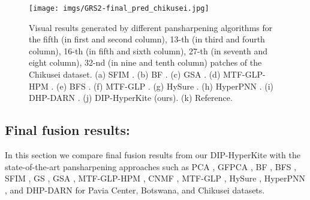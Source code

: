 \documentclass[journal]{IEEEtran}
\begin{document}
    \begin{figure}[tb]
        \centering
        \texttt{[image: imgs/GRS2-final\_pred\_chikusei.jpg]}
        \caption{Visual results generated by different pansharpening algorithms for the fifth (in first and second column), 13-th (in third and fourth column), 16-th (in fifth and sixth column), 27-th (in seventh and eight column), 32-nd (in nine and tenth column) patches of the Chikusei dataset. (a) SFIM \cite{SFIM}. (b) BF \cite{BF}. (c) GSA \cite{GS}. (d) MTF-GLP-HPM \cite{MTF-GLP-HPM}. (e) BFS \cite{BFS}. (f) MTF-GLP \cite{MTF-GLP}. (g) HySure \cite{hysure}. (h) HyperPNN \cite{Hyper-PNN}. (i) DHP-DARN \cite{DHP-DARN}. (j) DIP-HyperKite (ours). (k) Reference.}
        \label{fig:chikusei_final}
    \end{figure}
    
\subsection{Final fusion results:}
    \label{sec:final_fusion_results}
    In this section we compare final fusion results from our DIP-HyperKite with the state-of-the-art pansharpening approaches such as PCA \cite{PCA1}, GFPCA \cite{GFPCA}, BF \cite{BF}, BFS \cite{BFS}, SFIM \cite{SFIM}, GS \cite{GS}, GSA \cite{GS}, MTF-GLP-HPM \cite{MTF-GLP-HPM}, CNMF \cite{CNMF}, MTF-GLP \cite{MTF-GLP}, HySure \cite{hysure}, HyperPNN \cite{Hyper-PNN}, and DHP-DARN \cite{DHP-DARN} for Pavia Center, Botswana, and Chikusei datasets.
    
\end{document}

